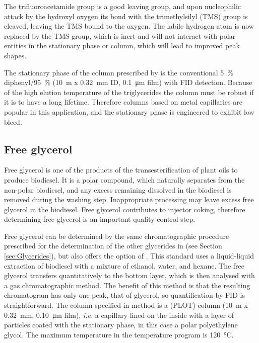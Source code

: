 The trifluoroacetamide group is a good leaving group, and upon nucleophilic
attack by the hydroxyl oxygen its bond with the trimethylsilyl (TMS) group is
cleaved, leaving the TMS bound to the oxygen. The labile hydrogen atom is now
replaced by the TMS group, which is inert and will not interact with polar
entities in the stationary phase or column, which will lead to improved peak
shapes.

The stationary phase of the column prescribed by  is the
conventional \SI{5}{\percent} diphenyl/\SI{95}{\percent} (\SI{10}{\metre} x
\SI{0.32}{\milli\metre} ID,  \SI{0.1}{\micro\metre} film) with FID detection.
Because of the high elution temperature of the triglycerides the column must be
robust if it is to have a long lifetime. Therefore columns based on metal
capillaries are popular in this application, and the stationary phase is
engineered to exhibit low bleed.

\subsection{Free glycerol}

Free glycerol is one of the products of the transesterification of plant oils to
produce biodiesel. It is a polar compound, which naturally separates from the
non-polar biodiesel, and any excess remaining dissolved in the biodiesel is
removed during the washing step. Inappropriate processing may leave excess free
glycerol in the biodiesel. Free glycerol contributes to injector coking,
therefore determining free glycerol is an important quality-control step.

Free glycerol can be determined by the same chromatographic procedure prescribed
for the determination of the other glycerides in  (see Section
\ref{sec:Glycerides}), but  also offers the option of . This standard uses a liquid-liquid extraction of biodiesel with a
mixture of ethanol, water, and hexane. The free glycerol transfers
quantitatively to the bottom layer, which is then analysed with a gas
chromatographic method. The benefit of this method is that the resulting
chromatogram has only one peak, that of glycerol, so quantification by FID is
straightforward. The column specified in  method is a
 (PLOT) column (\SI{10}{\metre} x
\SI{0.32}{\milli\metre}, \SI{0.10}{\micro\metre} film), \textit{i.e.} a
capillary lined on the inside with a layer of particles coated with the
stationary phase, in this case a polar polyethylene glycol. The maximum
temperature in the temperature program is \SI{120}{\celsius}.

